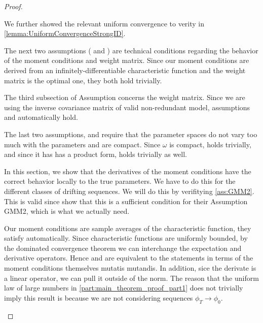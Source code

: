 \documentclass[11pt, letterpaper, twoside, final]{article}
\begin{document}
\begin{appendices}
\begin{proof}
\begin{proofpart}

    We further showed the relevant uniform convergence to verity  in
    \cref{lemma:UniformConvergenceStrongID}.
    
    The next two assumptions ( and ) are  technical conditions regarding
    the behavior of the moment conditions and weight matrix. 
    Since our moment conditions are derived from an infinitely-differentiable  characteristic function and the
    weight matrix is the optimal one, they both hold trivially.
    
    The third subsection of Assumption  concerns the weight matrix.
    Since we are using the inverse covariance matrix of valid non-redundant model, assumptions
     and  automatically hold.
    
    The last two assumptions,  and  require that the parameter spaces do
    not vary too much with the parameters and are compact.
    Since $\omega$ is compact,  holds trivially, and since it has  has a product form,
      holds trivially as well.
    
\end{proofpart}


\begin{proofpart}
    \label{part:mainTheoremProofPart2}

    In this section, we show that the derivatives of the moment conditions have the correct behavior locally to
    the true parameters.
    We have to do this for the different classes of drifting sequences.
    We will do this by verifitying \cref{ass:GMM2}.
    This is valid since \textcite{andrews2014Gmm} show that this is a sufficient condition for their Assumption
    GMM2, which is what we actually need. 

    Our moment conditions are sample averages of the characteristic function, they satisfy 
    automatically. 
    Since characteristic functions are uniformly bounded, by the dominated convergence theorem we can interchange the 
    expectation and derivative operators. 
    Hence  and  are equivalent to the statements in terms of the moment
    conditions themselves mutatis mutandis.  
    In addition, sice the derivate is a linear operator, we can pull it outside of the norm.
    The reason that the uniform law of large numbers in \cref{part:main_theorem_proof_part1} does not trivially
    imply this result is because we are not considering sequences $\phi_T \to \phi_0$. 



\end{proofpart}
\end{proof}
\end{appendices}
\end{document}
